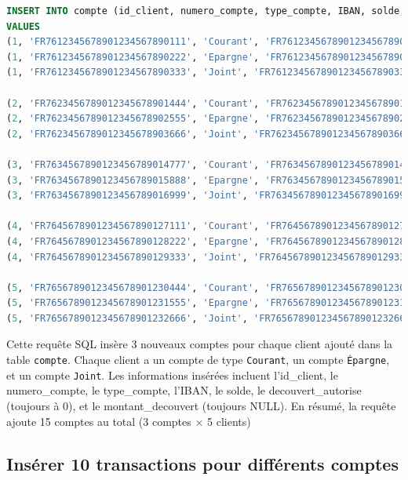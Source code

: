 \documentclass[12pt,a4paper]{article}
\begin{document}
\begin{lstlisting}[language=SQL]
INSERT INTO compte (id_client, numero_compte, type_compte, IBAN, solde, decouvert_autorise, montant_decouvert) 
VALUES 
(1, 'FR7612345678901234567890111', 'Courant', 'FR7612345678901234567890111', 1500.000, 1, 500.00), 
(1, 'FR7612345678901234567890222', 'Epargne', 'FR7612345678901234567890222', 5000.000, 1, 1000.00), 
(1, 'FR7612345678901234567890333', 'Joint', 'FR7612345678901234567890333', 10000.000, 1, 2000.00),
 
(2, 'FR7623456789012345678901444', 'Courant', 'FR7623456789012345678901444', 2000.000, 1, 600.00), 
(2, 'FR7623456789012345678902555', 'Epargne', 'FR7623456789012345678902555', 6000.000, 1, 1200.00), 
(2, 'FR7623456789012345678903666', 'Joint', 'FR7623456789012345678903666', 12000.000, 1, 2500.00),
 
(3, 'FR7634567890123456789014777', 'Courant', 'FR7634567890123456789014777', 2500.000, 1, 700.00), 
(3, 'FR7634567890123456789015888', 'Epargne', 'FR7634567890123456789015888', 7000.000, 1, 1500.00), 
(3, 'FR7634567890123456789016999', 'Joint', 'FR7634567890123456789016999', 15000.000, 1, 3000.00),
 
(4, 'FR7645678901234567890127111', 'Courant', 'FR7645678901234567890127111', 3000.000, 1, 800.00), 
(4, 'FR7645678901234567890128222', 'Epargne', 'FR7645678901234567890128222', 8000.000, 1, 1700.00), 
(4, 'FR7645678901234567890129333', 'Joint', 'FR7645678901234567890129333', 18000.000, 1, 4000.00),
 
(5, 'FR7656789012345678901230444', 'Courant', 'FR7656789012345678901230444', 3500.000, 1, 1000.00), 
(5, 'FR7656789012345678901231555', 'Epargne', 'FR7656789012345678901231555', 9000.000, 1, 2000.00), 
(5, 'FR7656789012345678901232666', 'Joint', 'FR7656789012345678901232666', 20000.000, 1, 5000.00);  
\end{lstlisting}

\vspace{.5cm}

Cette requête SQL insère 3 nouveaux comptes pour chaque client ajouté dans la table \texttt{compte}. Chaque client a un compte de type \texttt{Courant}, un compte \texttt{Épargne}, et un compte \texttt{Joint}. Les informations insérées incluent l'id\_client, le numero\_compte, le type\_compte, l'IBAN, le solde, le decouvert\_autorise (toujours à 0), et le montant\_decouvert (toujours NULL). En résumé, la requête ajoute 15 comptes au total (3 comptes × 5 clients) 

	\subsection{Insérer 10 transactions pour différents comptes}
	
\end{document}
